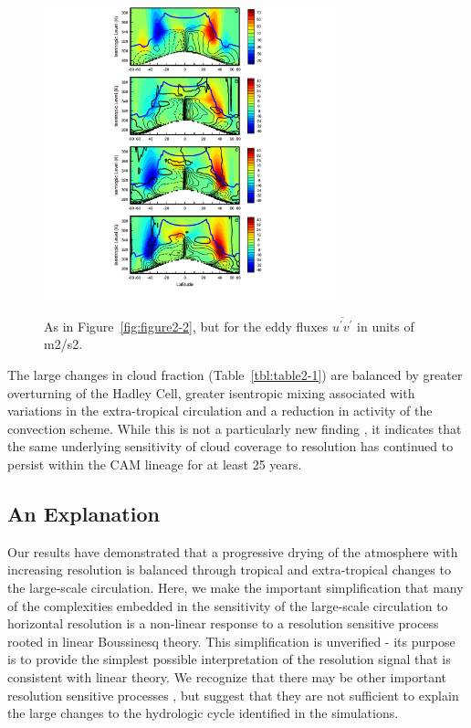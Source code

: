 \begin{figure}
\begin{center}
\noindent\includegraphics[width=20pc,angle=0]{chapter2/figure4.pdf}\\
\end{center}
\caption{As in Figure~\ref{fig:figure2-2}, but for the eddy fluxes $\overline{u^{\prime} v^{\prime}}$ in units of m2/s2.}
\label{fig:figure2-4}
\end{figure}

The large changes in cloud fraction (Table~\ref{tbl:table2-1}) are balanced by greater overturning of the Hadley Cell, greater isentropic mixing associated with variations in the extra-tropical circulation and a reduction in activity of the convection scheme. While this is not a particularly new finding \citep{KW1991JGR}, it indicates that the same underlying sensitivity of cloud coverage to resolution has continued to persist within the CAM lineage for at least 25 years.

\subsection{An Explanation}
Our results have demonstrated that a progressive drying of the atmosphere with increasing resolution is balanced through tropical and extra-tropical changes to the large-scale circulation. Here, we make the important simplification that many of the complexities embedded in the sensitivity of the large-scale circulation to horizontal resolution is a non-linear response to a resolution sensitive process rooted in linear Boussinesq theory. This simplification is unverified - its purpose is to provide the simplest possible interpretation of the resolution signal that is consistent with linear theory. We recognize that there may be other important resolution sensitive processes \citep[e.g.,][]{LETAL2015JCLIM}, but suggest that they are not sufficient to explain the large changes to the hydrologic cycle identified in the simulations. 

